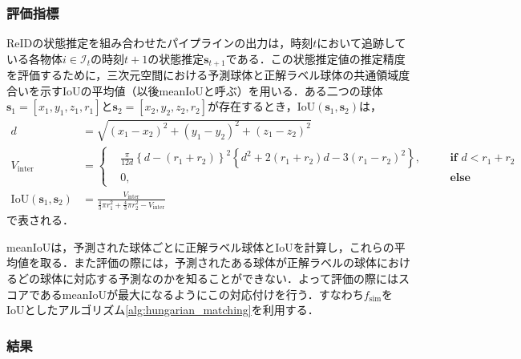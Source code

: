 \subsubsection{評価指標}

ReIDの状態推定を組み合わせたパイプラインの出力は，時刻$t$において追跡している各物体$i \in \mathcal{I}_t$の時刻$t+1$の状態推定$\bm{s}_{t+1}$である．この状態推定値の推定精度を評価するために，三次元空間における予測球体と正解ラベル球体の共通領域度合いを示すIoUの平均値（以後meanIoUと呼ぶ）を用いる．ある二つの球体$\bm{s}_1 = [x_1, y_1, z_1, r_1]$と$\bm{s}_2 = [x_2, y_2, z_2, r_2]$が存在するとき，IoU$(\bm{s}_1, \bm{s}_2)$は，
\begin{equation}
    \label{eq:sphere_iou}
    \begin{aligned}
        d &= \sqrt{(x_1 - x_2)^2 + (y_1 - y_2)^2 + (z_1 - z_2)^2}
        \\V_{\text{inter}} &= \left\{
            \begin{aligned}
                &\frac{\pi}{12 d} \left\{d - (r_1 + r_2)\right\}^2 \left\{d^2 + 2(r_1 + r_2)d - 3 (r_1 - r_2)^2\right\},& \quad &\textbf{if } d < r_1 + r_2
                \\ & 0,& &\textbf{else} 
            \end{aligned}
        \right.
        \\\text{IoU}(\bm{s}_1, \bm{s}_2) &= \frac{V_{\text{inter}}}{\frac{4}{3}\pi r_1^2 + \frac{4}{3}\pi r_2^2 - V_{\text{inter}}}
    \end{aligned}
\end{equation}
で表される．

meanIoUは，予測された球体ごとに正解ラベル球体とIoUを計算し，これらの平均値を取る．また評価の際には，予測されたある球体が正解ラベルの球体におけるどの球体に対応する予測なのかを知ることができない．よって評価の際にはスコアであるmeanIoUが最大になるようにこの対応付けを行う．すなわち$f_{\text{sim}}$をIoUとしたアルゴリズム\ref{alg:hungarian_matching}を利用する．

\subsubsection{結果}

